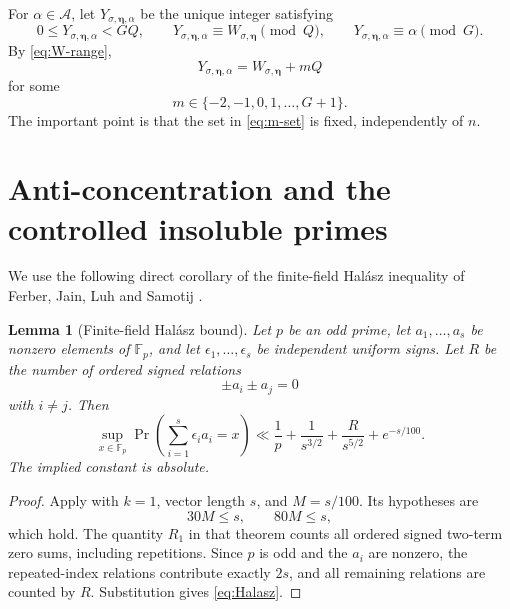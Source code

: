 \documentclass[11pt]{article}
\newtheorem{lemma}[theorem]{Lemma}
\newcommand{\F}{\mathbb F}
\begin{document}
For $\alpha\in\mathcal A$, let $Y_{\sigma,\boldsymbol\eta,\alpha}$ be the unique integer satisfying
\begin{equation}\label{eq:Y-CRT}
  0\leq Y_{\sigma,\boldsymbol\eta,\alpha}<GQ,
  \qquad
  Y_{\sigma,\boldsymbol\eta,\alpha}\equiv W_{\sigma,\boldsymbol\eta}\pmod Q,
  \qquad
  Y_{\sigma,\boldsymbol\eta,\alpha}\equiv\alpha\pmod G.
\end{equation}
By \eqref{eq:W-range},
\begin{equation}\label{eq:Y-W-m}
  Y_{\sigma,\boldsymbol\eta,\alpha}
  =W_{\sigma,\boldsymbol\eta}+mQ
\end{equation}
for some
\begin{equation}\label{eq:m-set}
  m\in\{-2,-1,0,1,\ldots,G+1\}.
\end{equation}
The important point is that the set in \eqref{eq:m-set} is fixed, independently of $n$.

\section{Anti-concentration and the controlled insoluble primes}

We use the following direct corollary of the finite-field Hal\'asz inequality of Ferber, Jain, Luh and Samotij \cite[Theorem~1.4]{FJLS}.

\begin{lemma}[Finite-field Hal\'asz bound]\label{lem:Halasz}
Let $p$ be an odd prime, let $a_1,\ldots,a_s$ be nonzero elements of $\F_p$, and let $\epsilon_1,\ldots,\epsilon_s$ be independent uniform signs. Let $R$ be the number of ordered signed relations
\[
  \pm a_i\pm a_j=0
\]
with $i\neq j$. Then
\begin{equation}\label{eq:Halasz}
  \sup_{x\in\F_p}
  \Pr\left(\sum_{i=1}^{s}\epsilon_i a_i=x\right)
  \ll
  \frac1p+\frac1{s^{3/2}}+\frac{R}{s^{5/2}}+e^{-s/100}.
\end{equation}
The implied constant is absolute.
\end{lemma}

\begin{proof}
Apply \cite[Theorem~1.4]{FJLS} with $k=1$, vector length $s$, and $M=s/100$. Its hypotheses are
\[
  30M\leq s,
  \qquad
  80M\leq s,
\]
which hold. The quantity $R_1$ in that theorem counts all ordered signed two-term zero sums, including repetitions. Since $p$ is odd and the $a_i$ are nonzero, the repeated-index relations contribute exactly $2s$, and all remaining relations are counted by $R$. Substitution gives \eqref{eq:Halasz}.
\end{proof}
\end{document}
